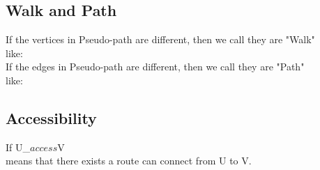 \documentclass{article}
\begin{document}
\subsection{Walk and Path}
\begin{flushleft}
If the vertices in Pseudo-path are different, then we call they are "Walk"\\
like: \\
If the edges in Pseudo-path are different, then we call they are "Path"\\
like: \\
\end{flushleft}

\subsection{Accessibility}
\begin{flushleft}
If U_{$access$}V\\
means that there exists a route can connect from U to V.
\end{flushleft}
\end{document}
